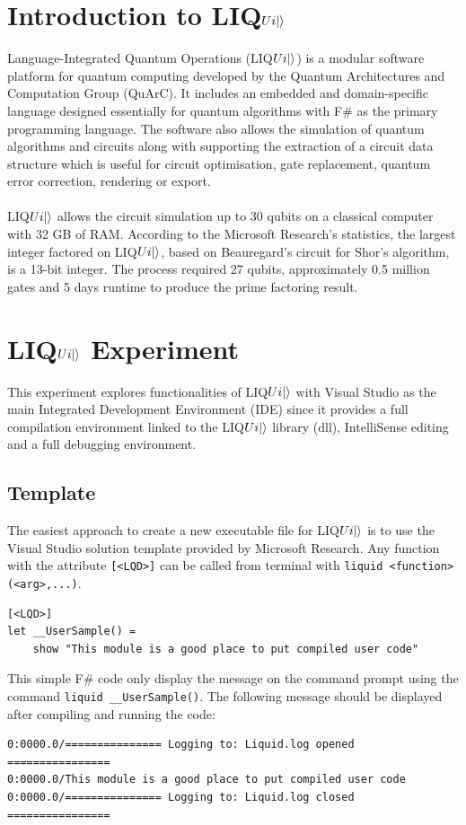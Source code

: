 \documentclass[12pt]{third-rep}
\begin{document}
\section{Introduction to LIQ$Ui{\left\vert{}\right\rangle}$}
Language-Integrated Quantum Operations (LIQ$Ui{\left\vert{}\right\rangle}$) is a modular software platform for quantum computing developed by the Quantum Architectures and Computation Group (QuArC). It includes an embedded and domain-specific language designed essentially for quantum algorithms with F\# as the primary programming language. The software also allows the simulation of quantum algorithms and circuits along with supporting the extraction of a circuit data structure which is useful for circuit optimisation, gate replacement, quantum error correction, rendering or export. \\\\
LIQ$Ui{\left\vert{}\right\rangle}$ allows the circuit simulation up to 30 qubits on a classical computer with 32 GB of RAM. According to the Microsoft Research's statistics, the largest integer factored on LIQ$Ui{\left\vert{}\right\rangle}$, based on Beauregard’s circuit for Shor's algorithm, is a 13-bit integer. The process required 27 qubits, approximately 0.5 million gates and 5 days runtime to produce the prime factoring result.

\section{LIQ$Ui{\left\vert{}\right\rangle}$ Experiment}
This experiment explores functionalities of LIQ$Ui{\left\vert{}\right\rangle}$ with Visual Studio as the main Integrated Development Environment (IDE) since it provides a full compilation environment linked to the LIQ$Ui{\left\vert{}\right\rangle}$ library (dll), IntelliSense editing and a full debugging environment.

\subsection{Template}
The easiest approach to create a new executable file for LIQ$Ui{\left\vert{}\right\rangle}$ is to use the Visual Studio solution template provided by Microsoft Research. Any function with the attribute \texttt{[<LQD>]} can be called from terminal with \texttt{liquid <function>(<arg>,...)}.
\begin{verbatim}
[<LQD>]
let __UserSample() =
    show "This module is a good place to put compiled user code"
\end{verbatim}
This simple F\# code only display the message on the command prompt using the command \texttt{liquid \_\_UserSample()}. The following message should be displayed after compiling and running the code: \\
\begin{verbatim}
0:0000.0/=============== Logging to: Liquid.log opened ================
0:0000.0/This module is a good place to put compiled user code
0:0000.0/=============== Logging to: Liquid.log closed ================
\end{verbatim}
\end{document}
